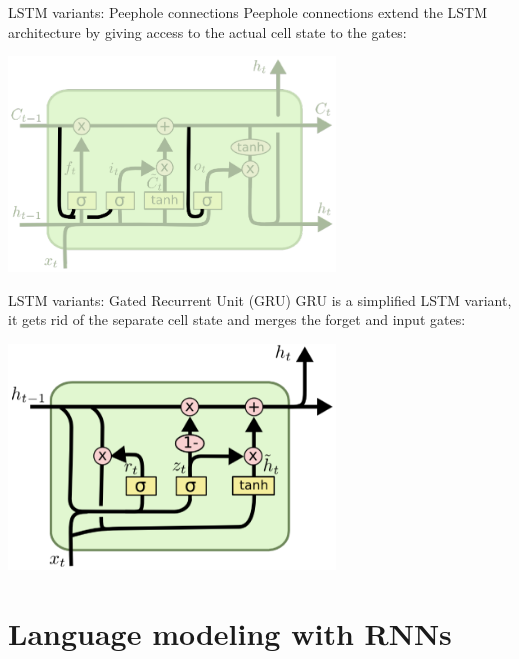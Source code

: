 \documentclass[style=upen, size=14pt]{powerdot}
\theoremstyle{definition}
\begin{document}
\begin{slide}[toc=Peephole connections]{LSTM variants: Peephole connections}
  Peephole connections extend the LSTM architecture by giving access to the
  actual cell state to the gates:
  \begin{center}
    \includegraphics[width=0.65\textwidth]{figures/peepholes.eps}
  \end{center}
\end{slide}


\begin{slide}[toc=GRU]{LSTM variants: Gated Recurrent Unit (GRU)}
  GRU is a simplified LSTM variant, it gets rid of the separate cell
  state and merges the forget and input gates:
  \begin{center}
    \includegraphics[width=0.65\textwidth]{figures/gru.eps}
  \end{center}
\end{slide}

\section[toc=LMs with RNNs]{Language modeling with RNNs}
\end{document}

